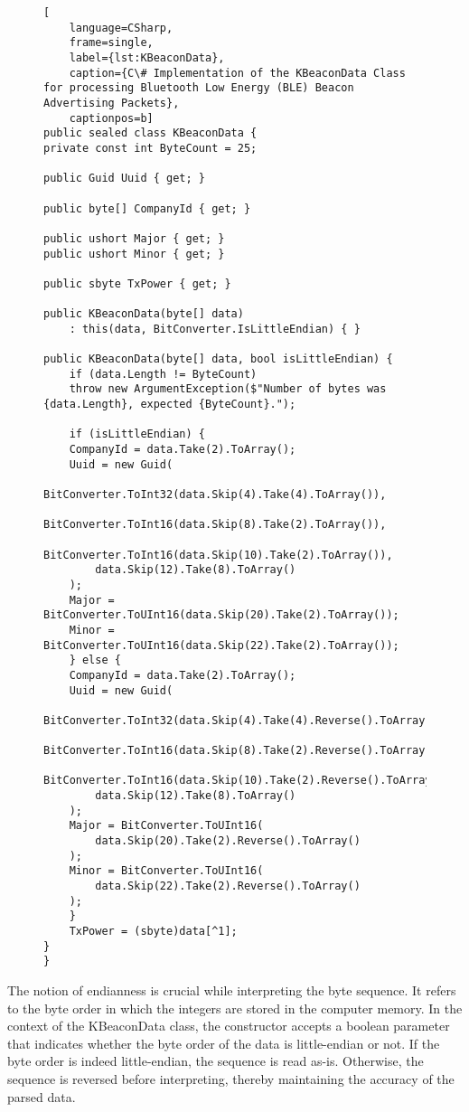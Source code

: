 \begin{figure}[h!]
\begin{lstlisting}[
	language=CSharp, 
	frame=single, 
	label={lst:KBeaconData},
	caption={C\# Implementation of the KBeaconData Class for processing Bluetooth Low Energy (BLE) Beacon Advertising Packets}, 
	captionpos=b] 
public sealed class KBeaconData {
private const int ByteCount = 25;

public Guid Uuid { get; }

public byte[] CompanyId { get; }

public ushort Major { get; }
public ushort Minor { get; }

public sbyte TxPower { get; }

public KBeaconData(byte[] data) 
	: this(data, BitConverter.IsLittleEndian) { }

public KBeaconData(byte[] data, bool isLittleEndian) {
	if (data.Length != ByteCount)
	throw new ArgumentException($"Number of bytes was {data.Length}, expected {ByteCount}.");

	if (isLittleEndian) {
	CompanyId = data.Take(2).ToArray();
	Uuid = new Guid(
		BitConverter.ToInt32(data.Skip(4).Take(4).ToArray()),
		BitConverter.ToInt16(data.Skip(8).Take(2).ToArray()),
		BitConverter.ToInt16(data.Skip(10).Take(2).ToArray()),
		data.Skip(12).Take(8).ToArray()
	);
	Major = BitConverter.ToUInt16(data.Skip(20).Take(2).ToArray());
	Minor = BitConverter.ToUInt16(data.Skip(22).Take(2).ToArray());
	} else {
	CompanyId = data.Take(2).ToArray();
	Uuid = new Guid(
		BitConverter.ToInt32(data.Skip(4).Take(4).Reverse().ToArray()),
		BitConverter.ToInt16(data.Skip(8).Take(2).Reverse().ToArray()),
		BitConverter.ToInt16(data.Skip(10).Take(2).Reverse().ToArray()),
		data.Skip(12).Take(8).ToArray()
	);
	Major = BitConverter.ToUInt16(
		data.Skip(20).Take(2).Reverse().ToArray()
	);
	Minor = BitConverter.ToUInt16(
		data.Skip(22).Take(2).Reverse().ToArray()
	);
	}
	TxPower = (sbyte)data[^1];
}
}
\end{lstlisting}
\end{figure}

The notion of endianness is crucial while interpreting the byte sequence.
It refers to the byte order in which the integers are stored in the computer memory. In the context of the KBeaconData class, the constructor accepts a boolean parameter that indicates whether the byte order of the data is little-endian or not. If the byte order is indeed little-endian, the sequence is read as-is. Otherwise, the sequence is reversed before interpreting, thereby maintaining the accuracy of the parsed data.

